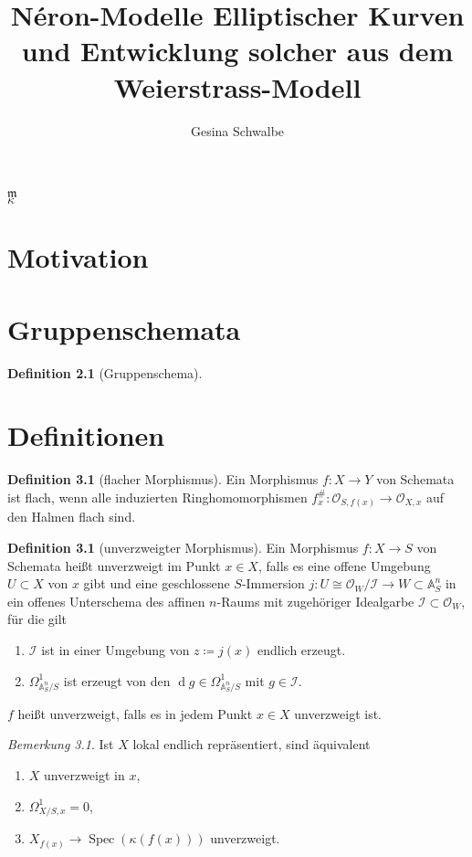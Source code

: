 \documentclass[english, german, parskip=half]{scrreprt}
\title{Néron-Modelle Elliptischer Kurven 
  und Entwicklung solcher aus dem Weierstrass-Modell}
\author{Gesina Schwalbe}
\theoremstyle{definition}
\newtheorem{Definition}[Satz]{Definition}
\theoremstyle{remark}
\newtheorem{Bemerkung}[Satz]{Bemerkung}
\DeclareMathOperator{\Spec}{Spec} %
\newcommand*{\A}{\ensuremath{\mathds{A}}} %
\renewcommand*{\m}{\mathfrak{m}} %
\renewcommand*{\k}{\kappa} %
\renewcommand*{\O}{\mathcal{O}} %
\newcommand*{\I}{\mathcal{I}} %
\newcommand*{\Om}[1]{\ensuremath{\Omega_{#1}^1}} %
\renewcommand*{\d}{\ensuremath{\operatorname{d}}} %
\begin{document}
$\m$\\
$\k$
\maketitle
\tableofcontents

\chapter{Motivation}

\chapter{Gruppenschemata}
\begin{Definition}[Gruppenschema]
\end{Definition}

\appendix
\chapter{Definitionen}
\begin{Definition}[flacher Morphismus]
Ein Morphismus $f\colon X\to Y$ von Schemata ist flach, wenn alle
induzierten Ringhomomorphismen $f_x^\#\colon \O_{S,f(x)}\to\O_{X,x}$  auf
den Halmen flach sind.
\cite[siehe][]{bosch, goodreduction}
\end{Definition}

\begin{Definition}[unverzweigter Morphismus]
  Ein Morphismus $f\colon X\to S$ von Schemata heißt unverzweigt im
  Punkt $x\in X$, falls es eine offene Umgebung
  $U\subset X$ von $x$ gibt und eine geschlossene $S$-Immersion
  $j\colon U\cong\O_W/\I\to W\subset\A_S^n$ in ein offenes Unterschema
  des affinen $n$-Raums mit zugehöriger Idealgarbe $\I\subset\O_W$,
  für die gilt
  \begin{enumerate}[label=(\alph*)]
  \item $\I$ ist in einer Umgebung von $z\coloneqq j(x)$ endlich erzeugt.
  \item $\Om{\A_S^n/S}$ ist erzeugt von den $\d g\in\Om{\A_S^n/S}$
    mit $g\in\I$.
  \end{enumerate}
  $f$ heißt unverzweigt, falls es in jedem Punkt $x\in X$
  unverzweigt ist.
\end{Definition}
\begin{Bemerkung}
  Ist $X$ lokal endlich repräsentiert, sind äquivalent
  \begin{enumerate}[label=(\roman*)]
  \item $X$ unverzweigt in $x$,
  \item $\Om{X/S,x}=0$,
  \item $X_{f(x)}\to \Spec(\k(f(x)))$ unverzweigt.
  \end{enumerate}
  \cite[siehe][8.4, Theorem 3]{bosch}
\end{Bemerkung}
\end{document}
